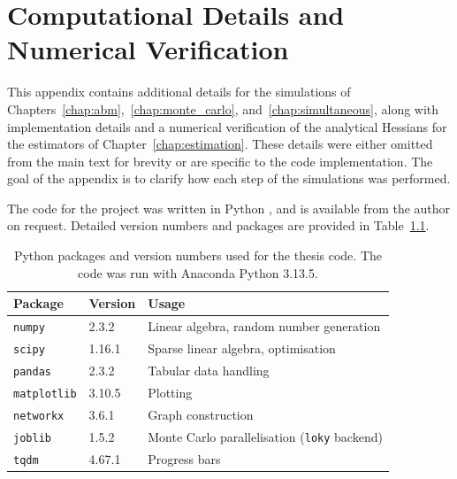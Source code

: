 
\chapter{Computational Details and Numerical Verification}
\label{app:code}
This appendix contains additional details for the simulations of Chapters~\ref{chap:abm},~\ref{chap:monte_carlo}, and~\ref{chap:simultaneous}, along with implementation details and a numerical verification of the analytical Hessians for the estimators of Chapter~\ref{chap:estimation}. These details were either omitted from the main text for brevity or are specific to the code implementation. The goal of the appendix is to clarify how each step of the simulations was performed.

The code for the project was written in Python \parencite{Python313}, and is available from the author on request. Detailed version numbers and packages are provided in Table~\ref{tab:code_packages}.

\begin{table}[htbp]
\centering
\footnotesize
\caption[Python packages and versions used for the thesis code]{Python packages and version numbers used for the thesis code. The code was run with Anaconda Python 3.13.5.}
\label{tab:code_packages}
\begin{tabular}{lll}
\toprule
Package & Version & Usage \\
\midrule
\texttt{numpy} \parencite{Harris2020NumPy}           & 2.3.2   & Linear algebra, random number generation \\
\texttt{scipy} \parencite{Virtanen2020SciPy}         & 1.16.1  & Sparse linear algebra, optimisation \\
\texttt{pandas} \parencite{McKinney2010Pandas}       & 2.3.2   & Tabular data handling \\
\texttt{matplotlib} \parencite{Hunter2007Matplotlib} & 3.10.5  & Plotting \\
\texttt{networkx} \parencite{Hagberg2008NetworkX}    & 3.6.1   & Graph construction \\
\texttt{joblib} \parencite{Joblib2025}               & 1.5.2   & Monte Carlo parallelisation (\texttt{loky} backend) \\
\texttt{tqdm} \parencite{Tqdm2024}                   & 4.67.1  & Progress bars \\
\bottomrule
\end{tabular}
\end{table}

